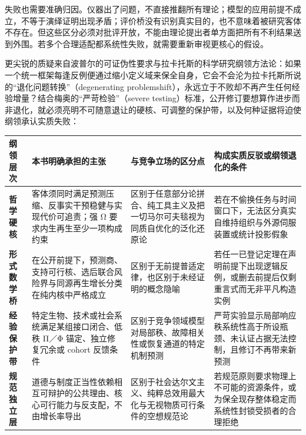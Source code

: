 \documentclass[
  11pt,
  oneside]{book}
\newcounter{none} %
\begin{document}
失败也需要准确归因。仪器出了问题，不直接推翻所有理论；模型的应用前提不成立，不等于演绎证明出现矛盾；评价桥没有识别真实目的，也不意味着被研究客体不存在。但这些区分必须对批评开放，不能由理论提出者单方面把所有不利结果送到外围。若多个合理适配都系统性失败，就需要重新审视更核心的假设。

更尖锐的质疑来自波普尔的可证伪性要求与拉卡托斯的科学研究纲领方法论：如果一个统一框架每逢反例便通过缩小定义域来保全自身，它会不会沦为拉卡托斯所说的``退化问题转换''（degenerating problemshift），永远立于不败却不再产生任何经验增量？结合梅奥的``严苛检验''（severe testing）标准，公开修订要想算作进步而非退化，就必须亮明不可随意退让的硬核、可调整的保护带，以及何种证据将迫使纲领承认实质失败：

{\def\LTcaptype{none} %
\begin{longtable}[]{@{}
  >{\raggedright\arraybackslash}p{}
  >{\raggedright\arraybackslash}p{}
  >{\raggedright\arraybackslash}p{}
  >{\raggedright\arraybackslash}p{}@{}}
\toprule\noalign{}
\begin{minipage}[b]{\linewidth}\raggedright
纲领层次
\end{minipage} & \begin{minipage}[b]{\linewidth}\raggedright
本书明确承担的主张
\end{minipage} & \begin{minipage}[b]{\linewidth}\raggedright
与竞争立场的区分点
\end{minipage} & \begin{minipage}[b]{\linewidth}\raggedright
构成实质反驳或纲领退化的条件
\end{minipage} \\
\midrule\noalign{}
\endhead
\bottomrule\noalign{}
\endlastfoot
\textbf{哲学硬核} & 客体须同时满足预测压缩、反事实干预稳健与实现代价可追责；强 Ω 要求内生再生至少一项构成约束 & 区别于任意部分论拼合、纯工具主义及把一切马尔可夫毯视为同质自优化的泛化还原论 & 若在不偷换任务与时间窗口下，无法区分真实自维持组织与外源伺服装置或统计投影假象 \\
\textbf{形式数学桥} & 在公开前提下，预测商、支持可行核、选后联合风险界与同源再生增长分类在纯内核中严格成立 & 区别于无前提普适定律，也区别于未经证明的概念隐喻 & 若任一已登记定理在声明前提下出现逻辑反例，或删去前提后仅剩重言式而无非平凡构造实例 \\
\textbf{经验保护带} & 特定生物、技术或社会系统满足某组接口闭合、低秩 Π／Φ 锚定、独立修复冗余或 cohort 反馈条件 & 区别于竞争领域模型对局部秩、故障相关性或恢复通道的特定机制预测 & 严苛实验显示局部响应秩系统性高于所设瓶颈、未认证占据无法控制，且修订不再带来新预测 \\
\textbf{规范独立层} & 道德与制度正当性依赖相互可辩护的公共理由、核心可行能力与反支配，不由增长率导出 & 区别于社会达尔文主义、纯粹总效用最大化与无视物质可行条件的空想规范论 & 若规范原则要求物理上不可能的资源条件，或为保全现存整体稳定而系统性封锁受损者的合理拒绝 \\
\end{longtable}
}
\end{document}
